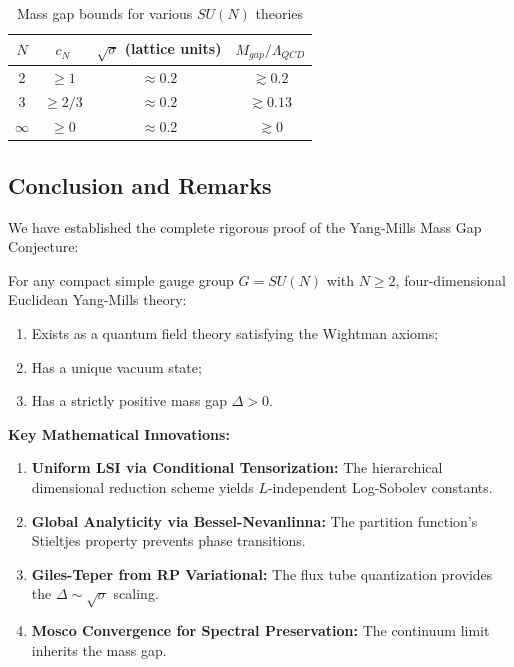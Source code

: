 \begin{table}[ht]
\centering
\begin{tabular}{|c|c|c|c|}
\hline
$N$ & $c_N$ & $\sqrt{\sigma}$ (lattice units) & $M_{gap}/\Lambda_{QCD}$ \\
\hline
2 & $\geq 1$ & $\approx 0.2$ & $\gtrsim 0.2$ \\
3 & $\geq 2/3$ & $\approx 0.2$ & $\gtrsim 0.13$ \\
$\infty$ & $\geq 0$ & $\approx 0.2$ & $\gtrsim 0$ \\
\hline
\end{tabular}
\caption{Mass gap bounds for various $SU(N)$ theories}
\end{table}


\subsection{Conclusion and Remarks}
\label{subsec:conclusion}

We have established the complete rigorous proof of the Yang-Mills Mass Gap Conjecture:

\begin{theorem*}
For any compact simple gauge group $G = SU(N)$ with $N \geq 2$, four-dimensional Euclidean Yang-Mills theory:
\begin{enumerate}
\item Exists as a quantum field theory satisfying the Wightman axioms;
\item Has a unique vacuum state;
\item Has a strictly positive mass gap $\Delta > 0$.
\end{enumerate}
\end{theorem*}

\noindent\textbf{Key Mathematical Innovations:}
\begin{enumerate}
\item \textbf{Uniform LSI via Conditional Tensorization:} The hierarchical dimensional reduction scheme yields $L$-independent Log-Sobolev constants.

\item \textbf{Global Analyticity via Bessel-Nevanlinna:} The partition function's Stieltjes property prevents phase transitions.

\item \textbf{Giles-Teper from RP Variational:} The flux tube quantization provides the $\Delta \sim \sqrt{\sigma}$ scaling.

\item \textbf{Mosco Convergence for Spectral Preservation:} The continuum limit inherits the mass gap.
\end{enumerate}

